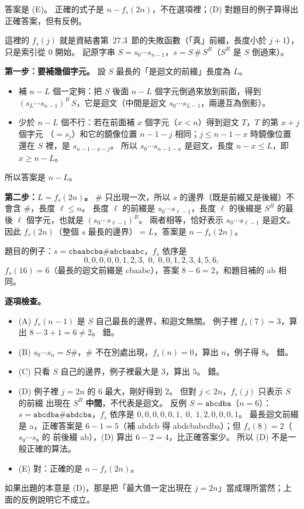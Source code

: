\begin{pastsoln}
答案是 (E)。 正確的式子是 $n - f_s(2n)$，不在選項裡；(D) 對題目的例子算得出正確答案，但有反例。

這裡的 $f_s(j)$ 就是資結書第~27.3~節的失敗函數（「真」前綴，長度小於 $j + 1$），只是索引從
$0$ 開始。 記原字串 $S = s_0 \cdots s_{n-1}$，$s = S\,\#\,S^R$（$S^R$ 是 $S$ 倒過來）。

\textbf{第一步：要補幾個字元。} 設 $S$ 最長的「是迴文的前綴」長度為 $L$。
\begin{itemize}
\item 補 $n - L$ 個一定夠：把 $S$ 後面 $n - L$ 個字元倒過來放到前面，得到
$(s_{L} \cdots s_{n-1})^R \, S$，它是迴文（中間是迴文 $s_0 \cdots s_{L-1}$，兩邊互為倒影）。
\item 少於 $n - L$ 個不行：若在前面補 $x$ 個字元（$x < n$）得到迴文 $T$，$T$ 的第 $x + j$ 個字元
（$= s_j$）和它的鏡像位置 $n - 1 - j$ 相同；$j \le n - 1 - x$ 時鏡像位置還在 $S$ 裡，是
$s_{n-1-x-j}$。 所以 $s_0 \cdots s_{n-1-x}$ 是迴文，長度 $n - x \le L$，即 $x \ge n - L$。
\end{itemize}
所以答案是 $n - L$。

\textbf{第二步：$L = f_s(2n)$。} $\#$ 只出現一次，所以 $s$ 的邊界（既是前綴又是後綴）不會含
$\#$，長度 $\ell \le n$。 長度 $\ell$ 的前綴是 $s_0 \cdots s_{\ell-1}$，長度 $\ell$ 的後綴是
$S^R$ 的最後 $\ell$ 個字元，也就是 $(s_0 \cdots s_{\ell-1})^R$。 兩者相等，恰好表示
$s_0 \cdots s_{\ell-1}$ 是迴文。 因此 $f_s(2n)$（整個 $s$ 最長的邊界）$= L$，答案是
$n - f_s(2n)$。

題目的例子：$s = \texttt{cbaabcba\#abcbaabc}$，$f_s$ 依序是
\[
0,0,0,0,0,1,2,3,\;0,\;0,0,1,2,3,4,5,6,
\]
$f_s(16) = 6$（最長的迴文前綴是 cbaabc），答案 $8 - 6 = 2$，和題目補的 ab 相同。

\textbf{逐項檢查。}
\begin{itemize}
\item (A) $f_s(n - 1)$ 是 $S$ 自己最長的邊界，和迴文無關。 例子裡 $f_s(7) = 3$，算出
$8 - 3 + 1 = 6 \ne 2$。 錯。
\item (B) $s_0 \cdots s_n = S\#$，$\#$ 不在別處出現，$f_s(n) = 0$，算出 $n$，例子得 $8$。 錯。
\item (C) 只看 $S$ 自己的邊界，例子裡最大是 $3$，算出 $5$。 錯。
\item (D) 例子裡 $j = 2n$ 的 $6$ 最大，剛好得到 $2$。 但對 $j < 2n$，$f_s(j)$ 只表示 $S$ 的前綴
出現在 $S^R$ \textbf{中間}，不代表是迴文。 反例 $S = \texttt{abcdba}$（$n = 6$）：
$s = \texttt{abcdba\#abdcba}$，$f_s$ 依序是 $0,0,0,0,0,1,\;0,\;1,2,0,0,0,1$。 最長迴文前綴是
a，正確答案是 $6 - 1 = 5$（補 abdcb 得 abdcbabcdba）；但 $f_s(8) = 2$（$s_0 \cdots s_8$ 的
前後綴 ab），(D) 算出 $6 - 2 = 4$，比正確答案少。 所以 (D) 不是一般正確的算法。
\item (E) 對：正確的是 $n - f_s(2n)$。
\end{itemize}

如果出題的本意是 (D)，那是把「最大值一定出現在 $j = 2n$」當成理所當然；上面的反例說明它不成立。
\end{pastsoln}
